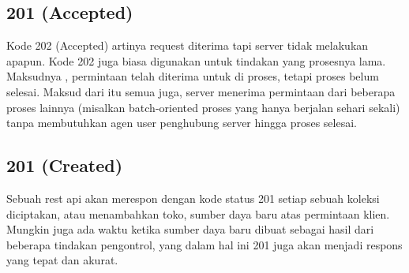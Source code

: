 \documentclass[12pt,a4paper]{article}
\begin{document}
\subsection{201 (Accepted)}
Kode 202 (Accepted) artinya request diterima tapi server tidak melakukan apapun. Kode 202 juga biasa digunakan untuk tindakan yang prosesnya lama. Maksudnya , permintaan telah diterima untuk di proses, tetapi proses belum selesai. 
Maksud dari itu semua juga, server menerima permintaan dari beberapa proses lainnya (misalkan batch-oriented proses yang hanya berjalan sehari sekali) tanpa membutuhkan agen user penghubung server hingga proses selesai.
\subsection{201 (Created)}
Sebuah rest api akan merespon dengan kode status 201 setiap sebuah koleksi diciptakan, atau menambahkan toko, sumber daya baru atas permintaan klien. Mungkin juga ada waktu ketika sumber daya baru dibuat sebagai hasil dari beberapa tindakan pengontrol, yang dalam hal ini 201 juga akan menjadi respons yang tepat dan akurat.
\end{document}
